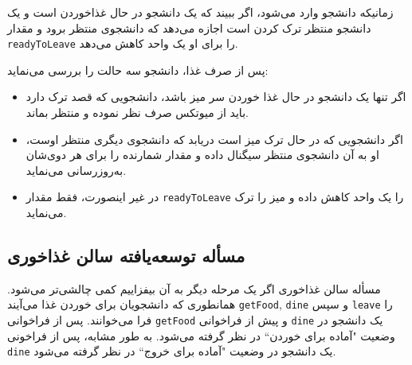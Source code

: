 \documentclass{book}
\begin{document}
    زمانیکه دانشجو وارد می‌شود، اگر ببیند که یک دانشجو در حال غذاخوردن است و یک دانشجو منتظر ترک کردن است اجازه می‌دهد که  دانشجوی منتظر 
    برود و مقدار  {\tt readyToLeave} را برای او یک واحد کاهش می‌دهد. 

\newpage
    پس از صرف غذا، دانشجو سه حالت را بررسی می‌نماید:

\begin{itemize}

\item %
    اگر تنها یک دانشجو در حال غذا خوردن سر میز باشد، دانشجویی که قصد ترک دارد باید از میوتکس صرف نظر نموده و منتظر بماند. 

\item %
    اگر دانشجویی که در حال ترک میز است دریابد که دانشجوی دیگری منتظر اوست، او به آن دانشجوی منتظر سیگنال داده و مقدار شمارنده را برای هر دوی‌شان
    به‌روزرسانی می‌نماید. 

\item %
    در غیر اینصورت، فقط مقدار  {\tt readyToLeave}  را یک واحد کاهش داده و میز را ترک می‌نماید.

\end{itemize}


\subsection{مسأله توسعه‌یافته سالن غذاخوری}

    مسأله سالن غذاخوری اگر یک مرحله دیگر به آن بیفزاییم کمی چالشی‌تر می‌شود. 
    همانطوری که دانشجویان برای خوردن غذا می‌آیند {\tt getFood}, {\tt dine}  و سپس {\tt leave} را فرا می‌خوانند. 
    پس از فراخوانی {\tt getFood}  و پیش از فراخوانی {\tt dine} یک دانشجو در وضعیت "آماده برای خوردن`` در نظر گرفته می‌شود. 
    به طور مشابه، پس از فراخونی {\tt dine} یک دانشجو در وضعیت "آماده برای خروج`` در نظر گرفته می‌شود. 
\end{document}

